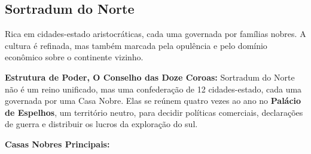 \subsection*{Sortradum do Norte}
Rica em cidades-estado aristocráticas, cada uma governada por famílias nobres. A cultura é refinada, mas também marcada pela opulência e pelo domínio econômico sobre o continente vizinho.

\textbf{\ringmfamily Estrutura de Poder, O Conselho das Doze Coroas:}
Sortradum do Norte não é um reino unificado, mas uma confederação de 12 cidades-estado, cada uma governada por uma Casa Nobre. Elas se reúnem quatro vezes ao ano no \textbf{Palácio de Espelhos}, um território neutro, para decidir políticas comerciais, declarações de guerra e distribuir os lucros da exploração do sul.

\textbf{\ringmfamily Casas Nobres Principais:}
